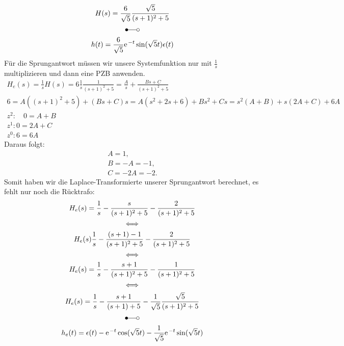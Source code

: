 \documentclass[11pt,a4paper,DIV=12]{scrartcl}
\begin{document}
\begin{gather}
	H(s)=\frac{6}{\sqrt{5}}\frac{\sqrt{5}}{(s+1)^2+5}\\
	\Laplace\nonumber\\
	h(t)=\frac{6}{\sqrt{5}}\e^{-t}\sin(\sqrt{5}t)\epsilon(t)
\end{gather}
Für die Sprungantwort müssen wir unsere Systemfunktion nur mit $\frac{1}{s}$ multiplizieren und dann eine PZB anwenden.
\begin{gather}
	H_e(s)=\frac{1}{s}H(s)=6\frac{1}{s}\frac{1}{(s+1)^2+5}=\frac{A}{s}+\frac{Bs+C}{(s+1)^2+5}\\
	6=A((s+1)^2+5)+(Bs+C)s=A(s^2+2s+6)+Bs^2+Cs=s^2(A+B)+s(2A+C)+6A\\
	z^2:\quad0=A+B\\
	z^1:0=2A+C\\
	z^0:6=6A
\end{gather}
Daraus folgt:
\begin{gather}
	A=1,\\
	B=-A=-1,\\
	C=-2A=-2.
\end{gather}
Somit haben wir die Laplace-Transformierte unserer Sprungantwort berechnet, es fehlt nur noch die Rücktrafo:
\begin{gather}
	H_e(s)=\frac{1}{s}-\frac{s}{(s+1)^2+5}-\frac{2}{(s+1)^2+5}\\
	\Longleftrightarrow\nonumber\\
	H_e(s)\frac{1}{s}-\frac{(s+1)-1}{(s+1)^2+5}-\frac{2}{(s+1)^2+5}\\
	\Longleftrightarrow\nonumber\\
	H_e(s)=\frac{1}{s}-\frac{s+1}{(s+1)^2+5}-\frac{1}{(s+1)^2+5}\\
	\Longleftrightarrow\nonumber\\
	H_e(s)=\frac{1}{s}-\frac{s+1}{(s+1)+5}-\frac{1}{\sqrt{5}}\frac{\sqrt{5}}{(s+1)^2+5}\\
	\Laplace\nonumber\\
	h_e(t)=\epsilon(t)-\e^{-t}\cos(\sqrt{5}t)-\frac{1}{\sqrt{5}}\e^{-t}\sin(\sqrt{5}t)
\end{gather}
\end{document}
